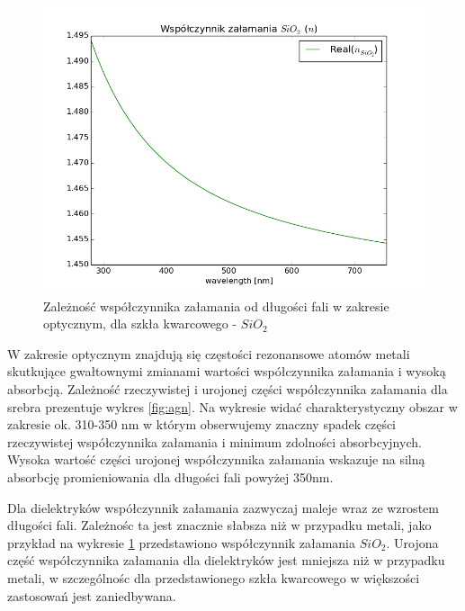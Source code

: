 \begin{figure}[tb]
	\includegraphics[width=\textwidth]{images/sio2n.png}
	\caption{Zależność współczynnika załamania od długości fali w zakresie optycznym, dla szkła kwarcowego -  $SiO_2$ \cite{MALITSON:65}   }
	\label{fig:sio2n}
\end{figure}
W zakresie optycznym znajdują się częstości rezonansowe atomów metali skutkujące gwałtownymi zmianami wartości współczynnika załamania i wysoką absorbcją. Zależność rzeczywistej i urojonej części współczynnika załamania  dla srebra prezentuje wykres \ref{fig:agn}. Na wykresie widać charakterystyczny obszar w zakresie ok. 310-350 nm w którym obserwujemy znaczny spadek części rzeczywistej współczynnika załamania i minimum zdolności absorbcyjnych. Wysoka wartość części urojonej współczynnika załamania wskazuje na silną absorbcję promieniowania dla długości fali powyżej 350nm.

Dla dielektryków współczynnik załamania zazwyczaj maleje wraz ze wzrostem długości fali. Zależnośc ta jest znacznie słabsza niż w przypadku metali, jako przykład na wykresie \ref{fig:sio2n} przedstawiono współczynnik załamania $SiO_2$. Urojona część współczynnika załamania dla dielektryków jest mniejsza niż w przypadku metali, w szczególnośc dla przedstawionego szkła kwarcowego w większości zastosowań jest zaniedbywana.

